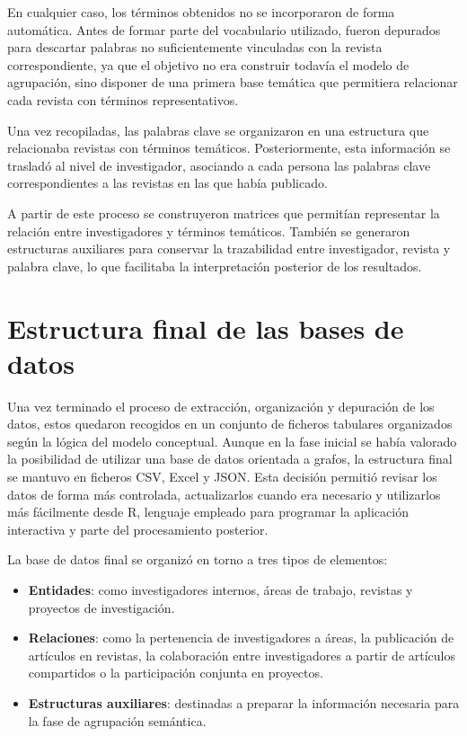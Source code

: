 \documentclass[11pt,spanish,listoffigures,listoftables]{tfgetsinf}
\begin{document}
En cualquier caso, los términos obtenidos no se incorporaron de forma automática. Antes de formar parte del vocabulario utilizado, fueron depurados para descartar palabras no suficientemente vinculadas con la revista correspondiente, ya que el objetivo no era construir todavía el modelo de agrupación, sino disponer de una primera base temática que permitiera relacionar cada revista con términos representativos.

Una vez recopiladas, las palabras clave se organizaron en una estructura que relacionaba revistas con términos temáticos. Posteriormente, esta información se trasladó al nivel de investigador, asociando a cada persona las palabras clave correspondientes a las revistas en las que había publicado.

A partir de este proceso se construyeron matrices que permitían representar la relación entre investigadores y términos temáticos. También se generaron estructuras auxiliares para conservar la trazabilidad entre investigador, revista y palabra clave, lo que facilitaba la interpretación posterior de los resultados.

\section{Estructura final de las bases de datos}

Una vez terminado el proceso de extracción, organización y depuración de los datos, estos quedaron recogidos en un conjunto de ficheros tabulares organizados según la lógica del modelo conceptual. Aunque en la fase inicial se había valorado la posibilidad de utilizar una base de datos orientada a grafos, la estructura final se mantuvo en ficheros CSV, Excel y JSON. Esta decisión permitió revisar los datos de forma más controlada, actualizarlos cuando era necesario y utilizarlos más fácilmente desde R, lenguaje empleado para programar la aplicación interactiva y parte del procesamiento posterior.

La base de datos final se organizó en torno a tres tipos de elementos:

\begin{itemize}
    \item \textbf{Entidades}: como investigadores internos, áreas de trabajo, revistas y proyectos de investigación.
    
    \item \textbf{Relaciones}: como la pertenencia de investigadores a áreas, la publicación de artículos en revistas, la colaboración entre investigadores a partir de artículos compartidos o la participación conjunta en proyectos.

    \item \textbf{Estructuras auxiliares}: destinadas a preparar la información necesaria para la fase de agrupación semántica.
\end{itemize}
\end{document}
